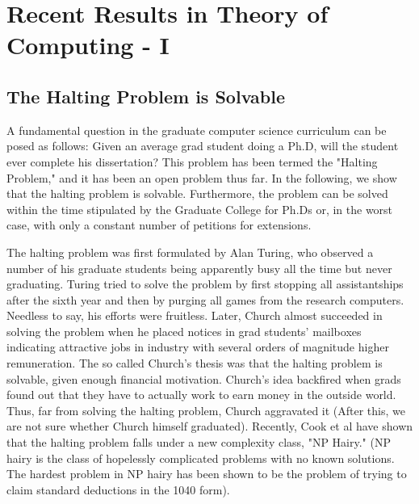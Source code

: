 \chapter{Recent Results in Theory of Computing - I}

\section{The Halting Problem is Solvable}

A fundamental question in the graduate computer science curriculum can be posed as follows: Given an average grad student doing a Ph.D, will the student ever complete his dissertation? This problem has been termed the "Halting Problem," and it has been an open problem thus far. In the following, we show that the halting problem is solvable. Furthermore, the problem can be solved within the time stipulated by the Graduate College for Ph.Ds or, in the worst case, with only a constant number of petitions for extensions.

The halting problem was first formulated by Alan Turing, who observed a number of his graduate students being apparently busy all the time but never graduating. Turing tried to solve the problem by first stopping all assistantships after the sixth year and then by purging all games from the research computers. Needless to say, his efforts were fruitless. Later, Church almost succeeded in solving the problem when he placed notices in grad students' mailboxes indicating attractive jobs in industry with several orders of magnitude higher remuneration. The so called Church's thesis was that the halting problem is solvable, given enough financial motivation. Church's idea backfired when grads found out that they have to actually work to earn money in the outside world. Thus, far from solving the halting problem, Church aggravated it (After this, we are not sure whether Church himself graduated). Recently, Cook et al have shown that the halting problem falls under a new complexity class, "NP Hairy." (NP hairy is the class of hopelessly complicated problems with no known solutions. The hardest problem in NP hairy has been shown to be the problem of trying to claim standard deductions in the 1040 form).

